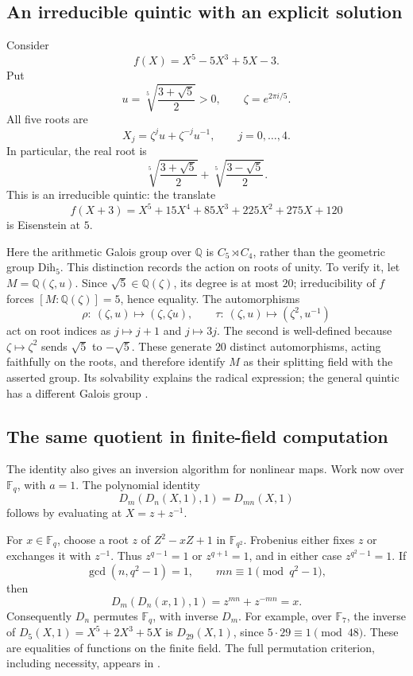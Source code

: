 \documentclass[11pt]{article}
\theoremstyle{remark}
\begin{document}
\subsection{An irreducible quintic with an explicit solution}

Consider
\[
f(X)=X^5-5X^3+5X-3.
\]
Put
\[
u=\sqrt[5]{\frac{3+\sqrt5}{2}}>0,
\qquad \zeta=e^{2\pi i/5}.
\]
All five roots are
\[
X_j=\zeta^j u+\zeta^{-j}u^{-1},\qquad j=0,\ldots,4.
\]
In particular, the real root is
\[
\sqrt[5]{\frac{3+\sqrt5}{2}}
+\sqrt[5]{\frac{3-\sqrt5}{2}}.
\]
This is an irreducible quintic: the translate
\[
f(X+3)=X^5+15X^4+85X^3+225X^2+275X+120
\]
is Eisenstein at \(5\).

Here the arithmetic Galois group over \(\mathbb Q\) is \(C_5\rtimes C_4\), rather than the geometric group \(\mathrm{Dih}_5\). This distinction records the action on roots of unity. To verify it, let \(M=\mathbb Q(\zeta,u)\). Since \(\sqrt5\in\mathbb Q(\zeta)\), its degree is at most \(20\); irreducibility of \(f\) forces \([M:\mathbb Q(\zeta)]=5\), hence equality. The automorphisms
\[
\rho:\ (\zeta,u)\longmapsto(\zeta,\zeta u),
\qquad
\tau:\ (\zeta,u)\longmapsto(\zeta^2,u^{-1})
\]
act on root indices as \(j\mapsto j+1\) and \(j\mapsto3j\). The second is well-defined because \(\zeta\mapsto\zeta^2\) sends \(\sqrt5\) to \(-\sqrt5\). These generate \(20\) distinct automorphisms, acting faithfully on the roots, and therefore identify \(M\) as their splitting field with the asserted group. Its solvability explains the radical expression; the general quintic has a different Galois group \cite{milne}.

\subsection{The same quotient in finite-field computation}

The identity also gives an inversion algorithm for nonlinear maps. Work now over \(\mathbb F_q\), with \(a=1\). The polynomial identity
\[
D_m(D_n(X,1),1)=D_{mn}(X,1)
\]
follows by evaluating at \(X=z+z^{-1}\).

For \(x\in\mathbb F_q\), choose a root \(z\) of \(Z^2-xZ+1\) in \(\mathbb F_{q^2}\). Frobenius either fixes \(z\) or exchanges it with \(z^{-1}\). Thus \(z^{q-1}=1\) or \(z^{q+1}=1\), and in either case \(z^{q^2-1}=1\). If
\[
\gcd(n,q^2-1)=1,
\qquad mn\equiv1\pmod{q^2-1},
\]
then
\[
D_m(D_n(x,1),1)=z^{mn}+z^{-mn}=x.
\]
Consequently \(D_n\) permutes \(\mathbb F_q\), with inverse \(D_m\). For example, over \(\mathbb F_7\), the inverse of \(D_5(X,1)=X^5+2X^3+5X\) is \(D_{29}(X,1)\), since \(5\cdot29\equiv1\pmod{48}\). These are equalities of functions on the finite field. The full permutation criterion, including necessity, appears in \cite{bluher}.
\end{document}
